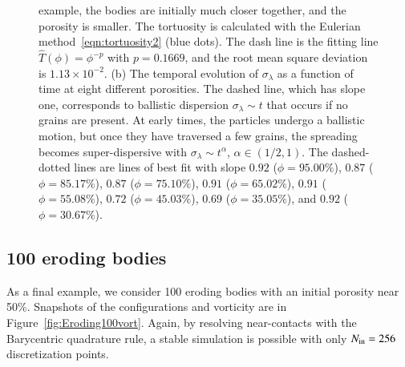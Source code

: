 \documentclass[preprint,10pt]{elsarticle}
\begin{document}
\begin{figure}[H]
{example, the bodies are initially much closer together, and the porosity
is smaller.  The tortuosity is calculated with the Eulerian
method~\eqref{eqn:tortuosity2} (blue dots).  The dash line is the
fitting line $\widehat{T}(\phi)=\phi^{-p}$ with $p=0.1669$, and the root
mean square deviation is $1.13 \times 10^{-2}$.  (b) The temporal
evolution of $\sigma_\lambda$ as a function of time at eight different
porosities.  The dashed line, which has slope one, corresponds to
ballistic dispersion $\sigma_\lambda \sim t$ that occurs if no grains
are present.  At early times, the particles undergo a ballistic motion,
but once they have traversed a few grains, the spreading becomes
super-dispersive with $\sigma_\lambda \sim t^{\alpha}$, $\alpha \in
(1/2,1)$.  The dashed-dotted lines are lines of best fit with slope
$0.92$ ($\phi=95.00\%$), $0.87$ ($\phi=85.17\%$), $0.87$
($\phi=75.10\%$), $0.91$ ($\phi=65.02\%$), $0.91$ ($\phi=55.08\%$),
$0.72$ ($\phi=45.03\%$), $0.69$ ($\phi=35.05\%$), and $0.92$
($\phi=30.67\%$).}
\end{figure}



\subsection{100 eroding bodies}
As a final example, we consider 100 eroding bodies with an initial
porosity near 50\%.  Snapshots of the configurations and vorticity are
in Figure~\ref{fig:Eroding100vort}.  Again, by resolving near-contacts
with the Barycentric quadrature rule, a stable simulation is possible
with only $N_{\mathrm{in}} = 256$ discretization points.
\end{document}
